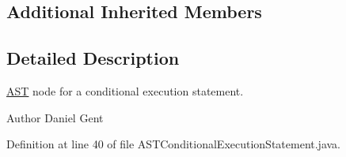 \subsection*{Additional Inherited Members}


\subsection{Detailed Description}
\hyperlink{classorg_1_1tzi_1_1use_1_1parser_1_1_a_s_t}{A\-S\-T} node for a conditional execution statement. \begin{DoxyAuthor}{Author}
Daniel Gent 
\end{DoxyAuthor}


Definition at line 40 of file A\-S\-T\-Conditional\-Execution\-Statement.\-java.



